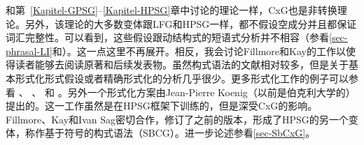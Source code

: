 和第~\ref{Kapitel-GPSG}--\ref{Kapitel-HPSG}章中讨论的理论一样，CxG也是非转换理论。另外，该理论的大多数变体跟LFG和HPSG一样，都不假设空成分并且都保证词汇完整性。可以看到，这些假设跟动结构式的短语式分析并不相容（参看\ref{sec-phrasal-LI}和\citealp{Mueller2006d,Mueller2007d}）。这一点这里不再展开。相反，我会讨论Fillmore和Kay的工作以使得读者能够去阅读原著和后续发表物。虽然构式语法的文献相对较多，但是关于基本形式化形式假设或者精确形式化的分析几乎很少。更多形式化工作的例子可以参看 、 \citet{Kay2002a}、 和 。另外一个形式化方案由Jean-Pierre Koenig\citeyearpar{Koenig99a}（以前是伯克利大学的）提出的。这一工作虽然是在HPSG框架下训练的，但是深受CxG的影响。Fillmore、Kay和Ivan Sag密切合作，修订了之前的版本，形成了HPSG的另一个变体，称作基于符号的构式语法（SBCG）\citep{Sag2010b,Sag2012a}。进一步论述参看\ref{sec-SbCxG}。


